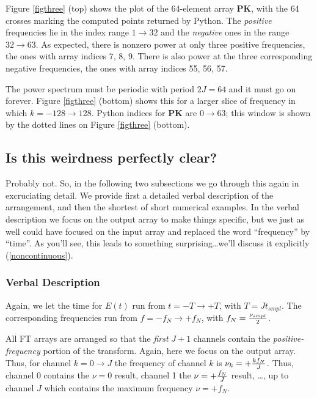 \documentclass[preprint]{aastex}
\begin{document}
	Figure \ref{figthree} (top) shows the plot of the 64-element
array {\bf PK}, with the 64 crosses marking the computed points returned
by Python.  The {\it positive} frequencies lie in the index range $1
\rightarrow 32$ and the {\it negative} ones in the range $32 \rightarrow
63$.  As expected, there is nonzero power at only three positive
frequencies, the ones with array indices 7, 8, 9.  There is also power at
the three corresponding negative frequencies, the ones with array indices
55, 56, 57. 

	The power spectrum must be periodic with period $2J = 64$ and it
must go on forever.  Figure \ref{figthree} (bottom) shows this for a
larger slice of frequency in which $k = -128 \rightarrow 128$.  Python
indices for {\bf PK} are $0 \rightarrow 63$; this window is shown by the
dotted lines on Figure \ref{figthree} (bottom). 

\subsection{ Is this weirdness perfectly clear? }

\label{clear}

	Probably not.  So, in the following two subsections we go
through this again in excruciating detail.  We provide first a detailed
verbal description of the arrangement, and then the shortest of short
numerical examples.  In the verbal description we focus on the output
array to make things specific, but we just as well could have focused
on the input array and replaced the word ``frequency'' by ``time''.  As
you'll see, this leads to something surprising\dots we'll discuss it
explicitly (\ref{noncontinuous}).

\subsubsection{Verbal Description}

	Again, we let the time for $E(t)$ run from $t = -T \rightarrow
+T$, with $T = J t_{smpl}$.  The corresponding frequencies run from $f =
-f_N \rightarrow +f_N$, with $f_N = {\nu_{smpl} \over 2}$. 

          All FT arrays are arranged so that the {\it first} $J+1$
channels contain the {\it positive-frequency} portion of the transform. 
Again, here we focus on the output array.  Thus, for channel $k = 0
\rightarrow J$ the frequency of channel $k$ is $\nu _k = +{k f_N \over
J}$.  Thus, channel 0 contains the $\nu =0$ result, channel 1 the $\nu =
+{f_N \over J}$ result, \dots, up to channel $J$ which contains the
maximum frequency $\nu = +f_N$. 
\end{document}
